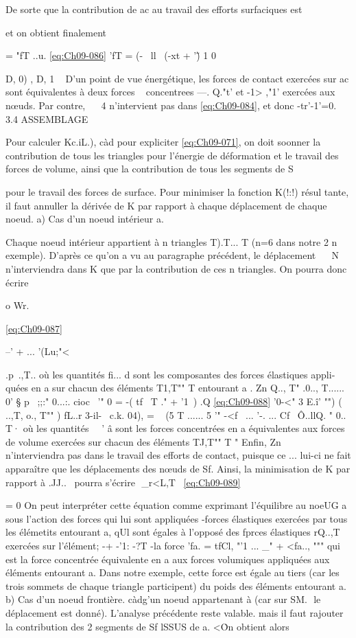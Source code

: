 De sorte que la contribution de ac au travail des efforts surfaciques est 

et on obtient finalement 

= "fT ..u. 
\eqref{eq:Ch09-086} 'fT = (-~ ll~ (-xt + '\~) 1 0 

D, 0)
, D,
1 
~ 
D'un point de  vue  énergétique,  les  forces  de  contact  exercées  
sur  ac  sont  équivalentes  à deux  forces  ~ concentrees  ---. Q."t'  et  -1> ,"1'  exercées  
aux  nœuds.  Par contre,  ~~ 4  n'intervient  pas  dans  \eqref{eq:Ch09-084},  et donc  -tr'-1'=0.  
3.4 ASSEMBLAGE  

Pour calculer Kc.iL.), càd pour expliciter \eqref{eq:Ch09-071}, on doit soonner la contribution de tous les triangles pour l'énergie de déformation et le 
travail des forces de volume, ainsi que la contribution de tous les segments de S{ pour le travail des forces de surface. Pour minimiser la fonction K(!:!) résul tante, il faut annuller la dérivée de K par rapport à chaque déplacement de chaque noeud. 
a) Cas d'un noeud intérieur a. 

Chaque noeud intérieur appartient à n triangles T).T... T (n=6 dans notre
2 n exemple). D'après ce qu'on a vu au paragraphe précédent, le déplacement ~~ 
N 
n'interviendra dans K que par la contribution de ces n triangles. On pour­ra donc écrire 

o Wr.

\eqref{eq:Ch09-087} 


--' + ... 
'(Lu;"< 

.p~.,T..
où les quantités fi... d sont les composantes des forces élastiques appli­quées en a sur chacun des éléments T1,T"" T entourant a .
Zn 
Q.., T" .0.., T......
0' § p~ ;;:" 0...:. cioc~ '" 0 = -( tf~ T ." + '1\ ) 
.Q
\eqref{eq:Ch09-088} 	'0-<" 3 E.î' "") ( ..,T, o., T"" ) 
fL..r 3-il-~ c.k. 04), = ~ (5 T ...... 5 '" -<f~ ... '-. ... Cf~
Ô..llQ. 
" 
0.. T· 
où les quantités ~~' â sont les forces concentrées en a équivalentes aux forces de volume exercées sur chacun des éléments TJ,T"" T " Enfin,
Zn ~~ n'interviendra pas dans le travail des efforts de contact, puisque ce
... 
lui-ci ne 	fait apparaître que les déplacements des nœuds de Sf. Ainsi, la minimisation de K par rapport à .JJ..~ pourra s'écrire
 
_r<L,T~
\eqref{eq:Ch09-089} 

= 0 
On peut interpréter cette équation comme exprimant l'équilibre au noeUG a sous l'action des forces qui lui sont appliquées -forces élastiques exercées par tous les élémetits entourant a, qUl sont égales à l'opposé des fprces élastiques rQ..,T~ exercées sur l'élément; -+ -'1: -?T 
-la force 'fa. = tfCl, "'1 ... _" + <fa.., """ qui est la force concentrée équivalente en a aux forces volumiques appliquées aux éléments entourant a. Dans notre exemple, cette force est égale au tiers (car les trois sommets de chaque triangle participent) du poids des éléments entourant a. 
b) Cas d'un noeud frontière. càdg'un noeud appartenant à (car sur SM.
 le déplacement est donné). L'analyse précédente reste valable. mais il 
faut rajouter la contribution des 2 segments de Sf lSSUS de a. <\. 
On obtient alors 

}
